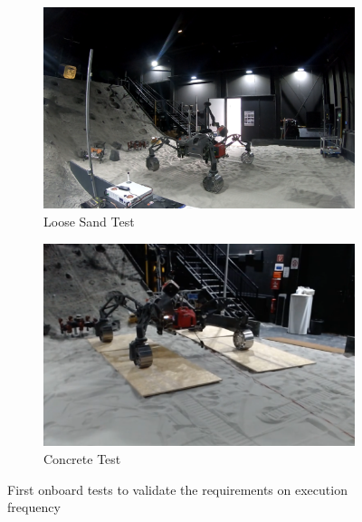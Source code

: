 \documentclass{article}
\begin{document}
\begin{figure}[!htb]
    \centering
    \begin{subfigure}[t]{0.45\textwidth}
        \includegraphics[width=\textwidth]{../figures/spacehall.png}
        \caption{Loose Sand Test}
    \end{subfigure}
    \begin{subfigure}[t]{0.45\textwidth}
        \includegraphics[width=\textwidth]{../figures/spacehallconcrete.png}
        \caption{Concrete Test}
    \end{subfigure}
    \caption{First onboard tests to validate the requirements on execution frequency}
    \label{fig:sh-tests}
\end{figure}
\end{document}
